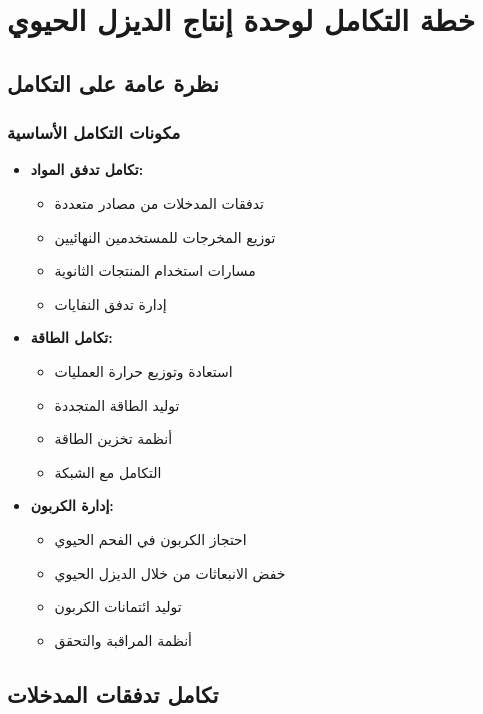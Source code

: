 \section{خطة التكامل لوحدة إنتاج الديزل الحيوي}

\subsection{نظرة عامة على التكامل}

\subsubsection{مكونات التكامل الأساسية}
\begin{itemize}
    \item \textbf{تكامل تدفق المواد:}
    \begin{itemize}
        \item تدفقات المدخلات من مصادر متعددة
        \item توزيع المخرجات للمستخدمين النهائيين
        \item مسارات استخدام المنتجات الثانوية
        \item إدارة تدفق النفايات
    \end{itemize}
    
    \item \textbf{تكامل الطاقة:}
    \begin{itemize}
        \item استعادة وتوزيع حرارة العمليات
        \item توليد الطاقة المتجددة
        \item أنظمة تخزين الطاقة
        \item التكامل مع الشبكة
    \end{itemize}
    
    \item \textbf{إدارة الكربون:}
    \begin{itemize}
        \item احتجاز الكربون في الفحم الحيوي
        \item خفض الانبعاثات من خلال الديزل الحيوي
        \item توليد ائتمانات الكربون
        \item أنظمة المراقبة والتحقق
    \end{itemize}
\end{itemize}

\subsection{تكامل تدفقات المدخلات}

